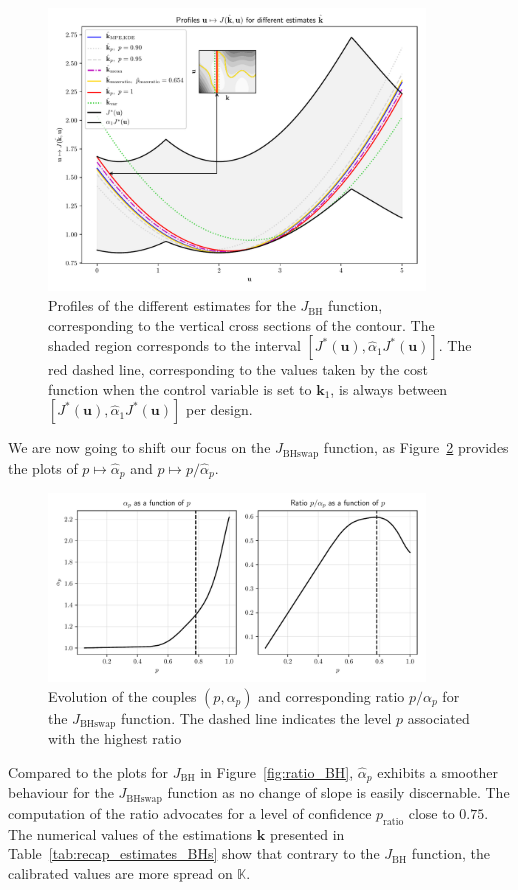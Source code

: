 \documentclass[preprint, 1p]{elsarticle}
\newcommand{\kest}{\hat{\mathbf{k}}}
\newcommand{\checkap}{{\alpha}_p}
\newcommand{\checka}{{\alpha}}
\newcommand{\Kspace}{\mathbb{K}}
\begin{document}
\begin{figure}[!h]
  \centering
\includegraphics[width=10cm]{Figures/profile_BH_all_estimates_noku.pdf}
\caption{Profiles of the different estimates for the $J_{\mathrm{BH}}$ function, corresponding to the vertical cross sections of the contour. The shaded region corresponds to the interval $[J^*(\mathbf{u}), \hat{\checka}_1 J^*(\mathbf{u})]$. The red dashed line, corresponding to the values taken by the cost function when the control variable is set to $\mathbf{k}_1$, is always between $[J^*(\mathbf{u}), \hat{\checka}_1 J^*(\mathbf{u})]$ per design.}
\label{fig:profiles_branin}
\end{figure}

We are now going to shift our focus on the $J_{\mathrm{BHswap}}$ function, as Figure~\ref{fig:ratio_BHs} provides the plots of $p\mapsto \hat{\checka}_p$ and $p\mapsto p/\hat{\checka}_p$.
\begin{figure}[ht]
  \centering
\includegraphics[width=10cm]{Figures/alpha_p_BHs.pdf}
\caption{Evolution of the couples $(p,\checkap)$ and corresponding ratio $p/\checkap$ for the $J_{\mathrm{BHswap}}$ function. The dashed line indicates the level $p$ associated with the highest ratio}
\label{fig:ratio_BHs}
\end{figure}

Compared to the plots for $J_{\mathrm{BH}}$ in Figure~\ref{fig:ratio_BH}, $\hat{\checka}_p$ exhibits a smoother behaviour for the $J_{\mathrm{BHswap}}$ function as no change of slope is easily discernable. The computation of the ratio advocates for a level of confidence $p_{\mathrm{ratio}}$ close to $0.75$. The numerical values of the estimations $\kest$ presented in Table~\ref{tab:recap_estimates_BHs} show that contrary to the $J_{\mathrm{BH}}$ function, the calibrated values are more spread on $\Kspace$.
\end{document}
